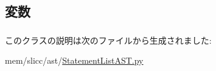 \subsection{変数}
\hypertarget{classslicc_1_1ast_1_1StatementListAST_1_1StatementListAST_aa25d5649a404c698dcacaa271a285c92}{
\subsubsection[{statements}]{}}
\label{classslicc_1_1ast_1_1StatementListAST_1_1StatementListAST_aa25d5649a404c698dcacaa271a285c92}


このクラスの説明は次のファイルから生成されました:\begin{DoxyCompactItemize}
\item 
mem/slicc/ast/\hyperlink{StatementListAST_8py}{StatementListAST.py}\end{DoxyCompactItemize}
